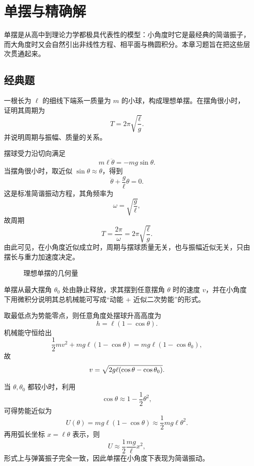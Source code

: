 \chapter{单摆与精确解}

单摆是从高中到理论力学都极具代表性的模型：小角度时它是最经典的简谐振子，而大角度时又会自然引出非线性方程、相平面与椭圆积分。本章习题旨在把这些层次贯通起来。

\section{经典题}

\begin{classic}
一根长为 $\ell$ 的细线下端系一质量为 $m$ 的小球，构成理想单摆。在摆角很小时，证明其周期为
\[
T=2\pi\sqrt{\frac{\ell}{g}}.
\]
并说明周期与振幅、质量的关系。
\begin{solution}
摆球受力沿切向满足
\[
m\ell\ddot\theta=-mg\sin\theta.
\]
当摆角很小时，取近似 $\sin\theta\approx \theta$，得到
\[
\ddot\theta+\frac{g}{\ell}\theta=0.
\]
这是标准简谐振动方程，其角频率为
\[
\omega=\sqrt{\frac{g}{\ell}},
\]
故周期
\[
T=\frac{2\pi}{\omega}=2\pi\sqrt{\frac{\ell}{g}}.
\]
由此可见，在小角度近似成立时，周期与摆球质量无关，也与振幅近似无关，只由摆长与重力加速度决定。

\begin{figure}[H]
\centering
{}
\caption{理想单摆的几何量}
\end{figure}
\end{solution}
\end{classic}

\begin{classic}
单摆从最大摆角 $\theta_0$ 处由静止释放，求其摆到任意摆角 $\theta$ 时的速度 $v$，并在小角度下用微积分说明其总机械能可写成“动能 $+$ 近似二次势能”的形式。
\begin{solution}
取最低点为势能零点，则任意角度处摆球升高高度为
\[
h=\ell(1-\cos\theta).
\]
机械能守恒给出
\[
\frac12 mv^2+mg\ell(1-\cos\theta)=mg\ell(1-\cos\theta_0),
\]
故
\[
v=\sqrt{2g\ell\qty(\cos\theta-\cos\theta_0)}.
\]

当 $\theta,\theta_0$ 都较小时，利用
\[
\cos\theta\approx 1-\frac12 \theta^2,
\]
可得势能近似为
\[
U(\theta)=mg\ell(1-\cos\theta)\approx \frac12 mg\ell\theta^2.
\]
再用弧长坐标 $x=\ell\theta$ 表示，则
\[
U\approx \frac12 \frac{mg}{\ell}x^2,
\]
形式上与弹簧振子完全一致，因此单摆在小角度下表现为简谐振动。
\end{solution}
\end{classic}

